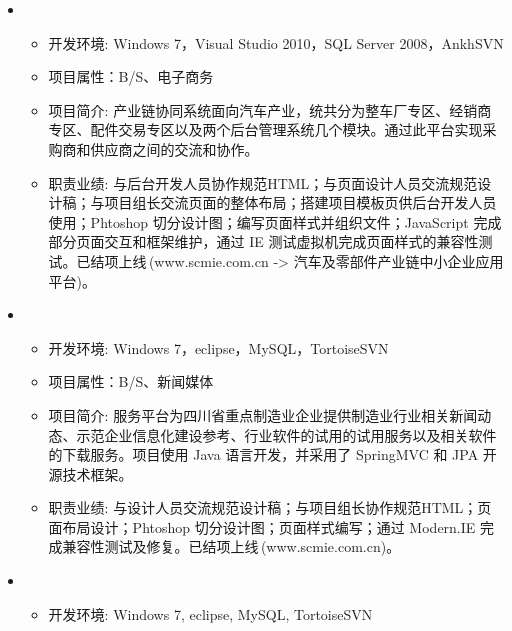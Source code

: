   \begin{itemize}[leftmargin=*]
    \item
      {\small
      \begin{itemize}
        \item 开发环境: Windows 7，Visual Studio 2010，SQL Server 2008，AnkhSVN
        \item 项目属性：B/S、电子商务
        \item 项目简介: 产业链协同系统面向汽车产业，统共分为整车厂专区、经销商专区、配件交易专区以及两个后台管理系统几个模块。通过此平台实现采购商和供应商之间的交流和协作。
        \item 职责业绩: 与后台开发人员协作规范HTML；与页面设计人员交流规范设计稿；与项目组长交流页面的整体布局；搭建项目模板页供后台开发人员使用；Phtoshop 切分设计图；编写页面样式并组织文件；JavaScript 完成部分页面交互和框架维护，通过 IE 测试虚拟机完成页面样式的兼容性测试。已结项上线$\,$(www.scmie.com.cn -> 汽车及零部件产业链中小企业应用平台)。
      \end{itemize}
      }
    \item
      {\small
      \begin{itemize}
        \item 开发环境: Windows 7，eclipse，MySQL，TortoiseSVN
        \item 项目属性：B/S、新闻媒体
        \item 项目简介: 服务平台为四川省重点制造业企业提供制造业行业相关新闻动态、示范企业信息化建设参考、行业软件的试用的试用服务以及相关软件的下载服务。项目使用 Java 语言开发，并采用了 SpringMVC 和 JPA 开源技术框架。
        \item 职责业绩: 与设计人员交流规范设计稿；与项目组长协作规范HTML；页面布局设计；Phtoshop 切分设计图；页面样式编写；通过 Modern.IE 完成兼容性测试及修复。已结项上线$\,$(www.scmie.com.cn)。
      \end{itemize}
      }
    \item
    {\small
    \begin{itemize}
      \item 开发环境: Windows 7, eclipse, MySQL, TortoiseSVN

\end{itemize}}
\end{itemize}
